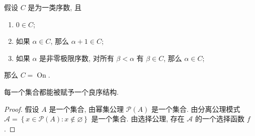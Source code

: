 \begin{theorem}[超限归纳法]
  \label{theorem-transfinite-induction}
  假设 \( C \) 是为一类序数, 且
  \begin{enumerate}
    \item \( 0 \in C \);
    \item 如果 \( \alpha \in C \), 那么 \( \alpha + 1 \in C \);
    \item 如果 \( \alpha \) 是非零极限序数, 对所有 \( \beta < \alpha \) 有 \(
      \beta \in C  \), 那么 \( \alpha \in C \);
  \end{enumerate}
  那么 \( C = \operatorname{On} \).
\end{theorem}

\begin{theorem}
  每一个集合都能被赋予一个良序结构.
\end{theorem}
\begin{proof}
  假设 \( A \) 是一个集合, 由幂集公理 \( \mathcal{P}(A) \) 是一个集合.
  由分离公理模式 \( \mathcal{A} = \left\lbrace x \in \mathcal{P}(A): x \notin
  \varnothing \right\rbrace \) 是一个集合.
  由选择公理, 存在 \( \mathcal{A} \) 的一个选择函数 \( f \).


\end{proof}
